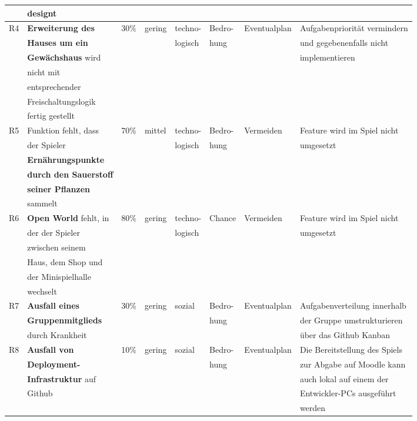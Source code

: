 \begin{table}[H]
\begin{tabular}{|c|l|l|l|l|l|l|l|}
        & designt &  &  &  &  &&  \\
        \hline
        R4 & \textbf{Erweiterung des} & 30\% & gering & techno- & Bedro- & Eventualplan & Aufgabenpriorität vermindern \\
        & \textbf{Hauses um ein} &  &  & logisch & hung&  & und gegebenenfalls nicht \\
        & \textbf{Gewächshaus} wird &  &  & & &  & implementieren \\
        & nicht mit &  &  &  &  & & \\
        & entsprechender &  &  &  &&  &  \\
        & Freischaltungslogik &  &  &&  &  &  \\
        & fertig gestellt &  &  &  & & &  \\
        \hline
        R5 & Funktion fehlt, dass & 70\% & mittel & techno- & Bedro- & Vermeiden & Feature wird im Spiel nicht \\
        & der Spieler &  &  & logisch &hung  &  &umgesetzt \\
        & \textbf{Ernährungspunkte} &&  &  &  &  &  \\
        & \textbf{durch den Sauerstoff} &&  &  &  &  &  \\
        & \textbf{seiner Pflanzen} &  &  &&  &  &  \\
        & sammelt &  &  &  &  &  &\\
        \hline
        R6 & \textbf{Open World} fehlt, in & 80\% & gering & techno- & Chance & Vermeiden &  Feature wird im Spiel nicht \\
        & der der Spieler &  &  & logisch& &  & umgesetzt \\
        & zwischen seinem &  &  &  &&  &  \\
        & Haus, dem Shop und &  &  &&  &  &  \\
        & der Minispielhalle &  &  & & &  &  \\
        & wechselt &  &  &  &  & & \\
        \hline
        R7 & \textbf{Ausfall eines} & 30\% & gering & sozial & Bedro- & Eventualplan & Aufgabenverteilung innerhalb \\
        & \textbf{Gruppenmitglieds} & & &  & hung &  & der Gruppe umstrukturieren \\
        & durch Krankheit &  &  &  & & & über das Github Kanban \\
        \hline
        R8 & \textbf{Ausfall von} & 10\% & gering & sozial & Bedro- & Eventualplan & Die Bereitstellung des Spiels \\
        & \textbf{Deployment-} &  &  && hung &  & zur Abgabe auf Moodle kann \\
        & \textbf{Infrastruktur} auf & & &  &  &  & auch lokal auf einem der \\
        & Github &  &  &  & & & Entwickler-PCs ausgeführt \\
        &  &  &  &  & & & werden \\
        \hline
    \end{tabular}
\end{table}




